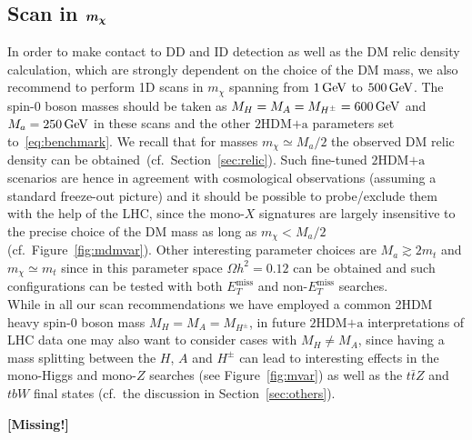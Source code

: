 \documentclass[a4paper, 11pt,notoc]{article}
\newcommand{\MET}{\ensuremath{E_T^\mathrm{miss}}\xspace}
\newcommand{\mA}{\ensuremath{M_{A}}\xspace}
\newcommand{\ma}{\ensuremath{M_{a}}\xspace}
\newcommand{\mH}{\ensuremath{M_{H}}\xspace}
\newcommand{\mHc}{\ensuremath{M_{H^{\pm}}}\xspace}
\newcommand{\hdma}{\ensuremath{\textrm{2HDM+a}}\xspace}
\def\bm#1{\mbox{\boldmath$#1$\unboldmath}}
\begin{document}
\subsection*{Scan in $\bm{m_\chi}$}

In order to make contact to DD and ID detection as well as the DM relic density calculation, which are strongly dependent on the choice of the DM mass, we also recommend to perform 1D scans in $m_\chi$ spanning from $1\, {\rm GeV}$ to $500 \, {\rm GeV}$. The  {\color{red} spin-0 boson} masses should be taken as $\mH = \mA = \mHc = 600 \, {\rm GeV}$ and $\ma = 250 \, {\rm GeV}$  in these scans and the other \hdma parameters set to~\eqref{eq:benchmark}. We recall that for masses $m_\chi \simeq \ma/2$ the observed DM relic density can be obtained~(cf.~Section~\ref{sec:relic}). Such fine-tuned \hdma scenarios are hence in agreement with cosmological observations (assuming a standard freeze-out picture) and  it should be possible to probe/exclude them with the help of the LHC, since the mono-$X$ signatures are largely insensitive to the precise choice of the DM mass as long as $m_\chi < \ma/2$  (cf.~Figure~\ref{fig:mdmvar}). {\color{magenta} Other interesting parameter choices are $M_a \gtrsim 2 m_t$ and $m_\chi \simeq m_t$  since in this parameter space $\Omega h^2 = 0.12$ can be obtained and such configurations can be tested with both $\MET$ and non-$\MET$ searches.} \\[2mm]

\noindent While in all our scan recommendations we have employed a common 2HDM heavy  {\color{red} spin-0 boson}  mass $\mH = \mA = \mHc$, in future \hdma interpretations of LHC data one may also want to consider cases with $M_H \neq M_A$, since having a mass splitting between the $H$, $A$ and $H^\pm$ can lead to interesting effects in the mono-Higgs and mono-$Z$ searches (see Figure~\ref{fig:mvar}) as well as the $t \bar t Z$ and $tbW$ final states (cf.~the discussion in Section~\ref{sec:others}).  


\acknowledgments 

{\bf [Missing!]}


\end{document}

